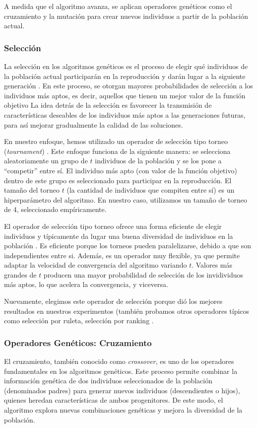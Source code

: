 A medida que el algoritmo avanza, se aplican operadores genéticos como el cruzamiento y la mutación para crear nuevos individuos a partir de la población actual.

\subsubsection{Selección}

La selección en los algoritmos genéticos es el proceso de elegir qué individuos de la población actual participarán en la reproducción y darán lugar a la siguiente generación \cite{Goldberg:1989}. En este proceso, se otorgan mayores probabilidades de selección a los individuos más aptos, es decir, aquellos que tienen un mejor valor de la función objetivo \cite{Goldberg:1989}
La idea detrás de la selección es favorecer la transmisión de características deseables de los individuos más aptos a las generaciones futuras, para así mejorar gradualmente la calidad de las soluciones.

En nuestro enfoque, hemos utilizado un operador de selección tipo torneo (\emph{tournament}) \cite{Goldberg:1989}. Este enfoque funciona de la siguiente manera: se selecciona aleatoriamente un grupo de $t$ individuos de la población y se los pone a ``competir'' entre sí. El individuo más apto (con valor de la función objetivo) dentro de este grupo es seleccionado para participar en la reproducción. El tamaño del torneo $t$ (la cantidad de individuos que compiten entre sí) es un hiperparámetro del algoritmo. En nuestro caso, utilizamos un tamaño de torneo de 4, seleccionado empíricamente.

El operador de selección tipo torneo ofrece una forma eficiente de elegir individuos y típicamente da lugar una buena diversidad de individuos en la población \cite{Goldberg:1989}. Es eficiente porque los torneos pueden paralelizarse, debido a que son independientes entre si. Además, es un operador muy flexible, ya que permite adaptar la velocidad de convergencia del algoritmo variando $t$. Valores más grandes de $t$ producen una mayor probabilidad de selección de los invidividuos más aptos, lo que acelera la convergencia, y viceversa. 

Nuevamente, elegimos este operador de selección porque dió los mejores resultados en nuestros experimentos (también probamos otros operadores típicos como selección por ruleta, selección por ranking \cite{Goldberg:1989}.

\subsubsection{Operadores Genéticos: Cruzamiento}
El cruzamiento, también conocido como \emph{crossover}, es uno de los operadores fundamentales en los algoritmos genéticos. 
Este proceso permite combinar la información genética de dos individuos seleccionados de la población (denominados padres) para generar nuevos individuos (descendientes o hijos), 
quienes heredan características de ambos progenitores.
De este modo, el algoritmo explora nuevas combinaciones genéticas y mejora la diversidad de la población.  

